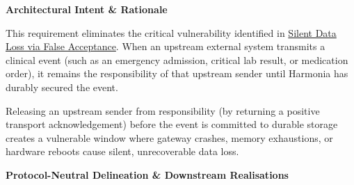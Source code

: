 \par\medskip\textbf{Architectural Intent \& Rationale}\par


This requirement eliminates the critical vulnerability identified in \href{\detokenize{../../../../../docs/markdown/01-motivation/drivers-assessments/assessments.md}}{Silent Data Loss via False Acceptance}. When an upstream external system transmits a clinical event (such as an emergency admission, critical lab result, or medication order), it remains the responsibility of that upstream sender until Harmonia has durably secured the event.



Releasing an upstream sender from responsibility (by returning a positive transport acknowledgement) before the event is committed to durable storage creates a vulnerable window where gateway crashes, memory exhaustions, or hardware reboots cause silent, unrecoverable data loss.



\par\medskip\textbf{Protocol-Neutral Delineation \& Downstream Realisations}\par


